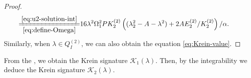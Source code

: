 \documentclass[11pt,reqno]{amsart}
\numberwithin{equation}{section}
\begin{document}
\begin{proof}
\begin{equation}
\begin{split}
	\xlongequal[\eqref{eq:define-Omega}]{\eqref{eq:u2-solution-int}}
		& 16\lambda^2 \Omega_1^2P  K^{(2)}_2 \left((\lambda_2^2-A-\lambda^2)+2A E^{(2)}_2/  K^{(2)}_2\right)/\alpha.
	\end{split}  
\end{equation}
Similarly, when $\lambda \in  Q^{(2)} _I$,  we can also obtain the equation \eqref{eq:Krein-value}.
\end{proof}
From the , we obtain the Krein signature $\mathcal{K}_1(\lambda)$.
Then, by the integrability we deduce the Krein signature $\mathcal{K}_{2}(\lambda)$.
\end{document}
